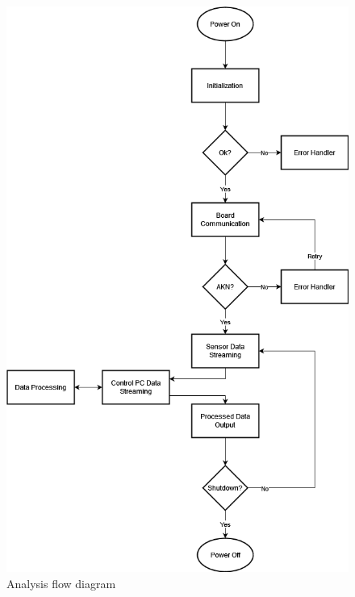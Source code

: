 \begin{figure}[!ht]
\end{figure}

\begin{figure}[!ht]
    \caption{Analysis flow diagram}\label{fig:analysis}
    \centering
    \includegraphics[scale=0.40]{chapters/project_plan/figures/Analysis_Flow_Diagram}
\end{figure}

